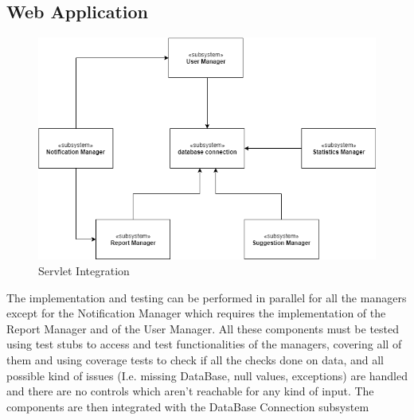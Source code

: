 \subsection{Web Application}
\begin{figure}[H]
\centering
\includegraphics[width=\textwidth]{Images/TestServlet.png}
\caption{\label{fig:ComWI}Servlet Integration}
\end{figure}
The implementation and testing can be performed in parallel for all the managers except for the Notification Manager which requires the implementation of the Report Manager and of the User Manager. All these components must be tested using test stubs to access and test functionalities of the managers, covering all of them and using coverage tests to check if all the checks done on data, and all possible kind of issues (I.e. missing DataBase, null values, exceptions) are handled and there are no controls which aren’t reachable for any kind of input. The components are then integrated with the DataBase Connection subsystem
